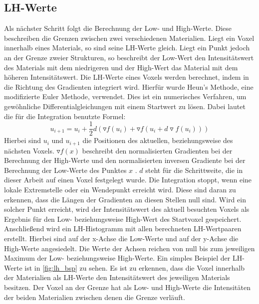 \subsection{LH-Werte}

Als nächster Schritt folgt die Berechnung der Low- und High-Werte. Diese beschreiben die Grenzen zwischen zwei verschiedenen Materialien. Liegt ein Voxel innerhalb eines Materials, so sind seine LH-Werte gleich. Liegt ein Punkt jedoch an der Grenze zweier Strukturen, so beschreibt der Low-Wert den Intensitätswert des Materials mit dem niedrigeren und der High-Wert das Material mit dem höheren Intensitätswert. Die LH-Werte eines Voxels werden berechnet, indem in die Richtung des Gradienten integriert wird. Hierfür wurde Heun's Methode, eine modifizierte Euler Methode, verwendet. Dies ist ein numerisches Verfahren, um gewöhnliche Differentialgleichungen mit einem Startwert zu lösen. Dabei lautet die für die Integration benutzte Formel:
\begin{equation}
	u_{i+1} = u_{i} + \frac{1}{2}d(\triangledown f (u_{i}) + \triangledown f(u_{i}+d \triangledown f(u_{i}))) 
\end{equation}
Hierbei sind $u_{i}$ und $u_{i+1}$ die Positionen des aktuellen, beziehungsweise des nächsten Voxels. $\triangledown f(x)$ beschreibt den normalisierten Gradienten bei der Berechnung der High-Werte und den normalisierten inversen Gradiente bei der Berechnung der Low-Werte des Punktes $x$ . $d$ steht für die Schrittweite, die in dieser Arbeit auf einen Voxel festgelegt wurde.
\newline
Die Integration stoppt, wenn eine lokale Extremstelle oder ein Wendepunkt erreicht wird. Diese sind daran zu erkennen, dass die Längen der Gradienten an diesen Stellen null sind. Wird ein solcher Punkt erreicht, wird der Intensitätswert des aktuell besuchten Voxels als Ergebnis für den Low- beziehungsweise High-Wert des Startvoxel gespeichert.
\newline
Anschließend wird ein LH-Histogramm mit allen berechneten LH-Wertpaaren erstellt. Hierbei sind auf der x-Achse die Low-Werte und auf der y-Achse die High-Werte angesiedelt. Die Werte der Achsen reichen von null bis zum jeweiligen Maximum der Low- beziehungsweise High-Werte.
\newline
Ein simples Beispiel der LH-Werte ist in \autoref{fig:lh_bsp} zu sehen. Es ist zu erkennen, dass die Voxel innerhalb der Materialien als LH-Werte den Intensitätswert des jeweiligen Materials besitzen. Der Voxel an der Grenze hat als Low- und High-Werte die Intensitäten der beiden Materialien zwischen denen die Grenze verläuft.




